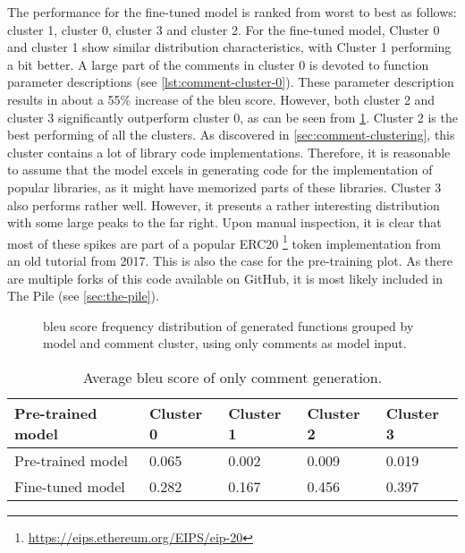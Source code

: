 The performance for the fine-tuned model is ranked from worst to best as follows: cluster 1, cluster 0, cluster 3 and cluster 2. For the fine-tuned model, Cluster 0 and cluster 1 show similar distribution characteristics, with Cluster 1 performing a bit better. A large part of the comments in cluster 0 is devoted to function parameter descriptions (see \cref{lst:comment-cluster-0}). These parameter description results in about a 55\% increase of the \acrshort{bleu} score. However, both cluster 2 and cluster 3 significantly outperform cluster 0, as can be seen from \cref{tab:comments-bleu-score}. Cluster 2 is the best performing of all the clusters. As discovered in \cref{sec:comment-clustering}, this cluster contains a lot of library code implementations. Therefore, it is reasonable to assume that the model excels in generating code for the implementation of popular libraries, as it might have memorized parts of these libraries. Cluster 3 also performs rather well. However, it presents a rather interesting distribution with some large peaks to the far right. Upon manual inspection, it is clear that most of these spikes are part of a popular ERC20 \footnote{\url{https://eips.ethereum.org/EIPS/eip-20}} token implementation from an old tutorial \cite{moritz2017how} from 2017. This is also the case for the pre-training plot. As there are multiple forks of this code available on GitHub, it is most likely included in The Pile (see \cref{sec:the-pile}).

\begin{figure}[htp]
    \centering
    
    \caption{\acrshort{bleu} score frequency distribution of generated functions grouped by model and comment cluster, using only comments as model input.}
    \label{fig:performance-comments}
\end{figure}

\begin{table}
    \def\arraystretch{1.5}
    \small
    \centering
    \caption{Average \acrshort{bleu} score of only comment generation.}
    \label{tab:comments-bleu-score}
    \begin{tabularx}{\textwidth}{XXXXX}
        \toprule
        \textbf{Pre-trained model} & Cluster 0 & Cluster 1 & Cluster 2 & Cluster 3\\
        \midrule
        Pre-trained model & 0.065 & 0.002 & 0.009 & 0.019\\
        Fine-tuned model & 0.282 & 0.167 & 0.456 & 0.397\\
        \bottomrule
    \end{tabularx}
\end{table}


